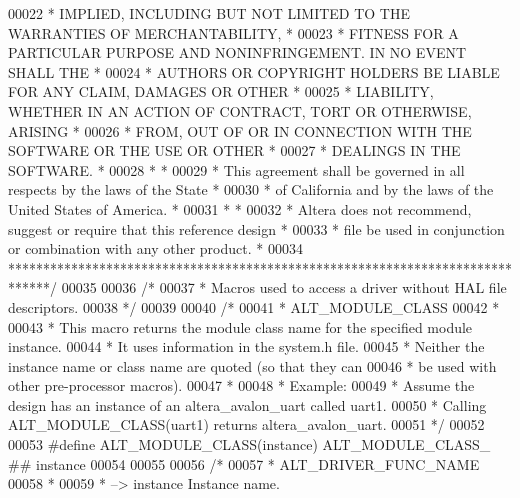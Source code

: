 \begin{DoxyCode}
00022 \textcolor{comment}{* IMPLIED, INCLUDING BUT NOT LIMITED TO THE WARRANTIES OF MERCHANTABILITY,    *}
00023 \textcolor{comment}{* FITNESS FOR A PARTICULAR PURPOSE AND NONINFRINGEMENT. IN NO EVENT SHALL THE *}
00024 \textcolor{comment}{* AUTHORS OR COPYRIGHT HOLDERS BE LIABLE FOR ANY CLAIM, DAMAGES OR OTHER      *}
00025 \textcolor{comment}{* LIABILITY, WHETHER IN AN ACTION OF CONTRACT, TORT OR OTHERWISE, ARISING     *}
00026 \textcolor{comment}{* FROM, OUT OF OR IN CONNECTION WITH THE SOFTWARE OR THE USE OR OTHER         *}
00027 \textcolor{comment}{* DEALINGS IN THE SOFTWARE.                                                   *}
00028 \textcolor{comment}{*                                                                             *}
00029 \textcolor{comment}{* This agreement shall be governed in all respects by the laws of the State   *}
00030 \textcolor{comment}{* of California and by the laws of the United States of America.              *}
00031 \textcolor{comment}{*                                                                             *}
00032 \textcolor{comment}{* Altera does not recommend, suggest or require that this reference design    *}
00033 \textcolor{comment}{* file be used in conjunction or combination with any other product.          *}
00034 \textcolor{comment}{******************************************************************************/}
00035 
00036 \textcolor{comment}{/*}
00037 \textcolor{comment}{ * Macros used to access a driver without HAL file descriptors.}
00038 \textcolor{comment}{ */}
00039 
00040 \textcolor{comment}{/*}
00041 \textcolor{comment}{ * ALT\_MODULE\_CLASS}
00042 \textcolor{comment}{ *}
00043 \textcolor{comment}{ * This macro returns the module class name for the specified module instance.}
00044 \textcolor{comment}{ * It uses information in the system.h file.}
00045 \textcolor{comment}{ * Neither the instance name or class name are quoted (so that they can}
00046 \textcolor{comment}{ * be used with other pre-processor macros).}
00047 \textcolor{comment}{ *}
00048 \textcolor{comment}{ * Example:}
00049 \textcolor{comment}{ *   Assume the design has an instance of an altera\_avalon\_uart called uart1.}
00050 \textcolor{comment}{ *   Calling ALT\_MODULE\_CLASS(uart1) returns altera\_avalon\_uart.}
00051 \textcolor{comment}{ */}
00052 
00053 \textcolor{preprocessor}{#define ALT\_MODULE\_CLASS(instance) ALT\_MODULE\_CLASS\_ ## instance}
00054 
00055 
00056 \textcolor{comment}{/*}
00057 \textcolor{comment}{ * ALT\_DRIVER\_FUNC\_NAME}
00058 \textcolor{comment}{ *}
00059 \textcolor{comment}{ *   --> instance               Instance name.}

\end{DoxyCode}
